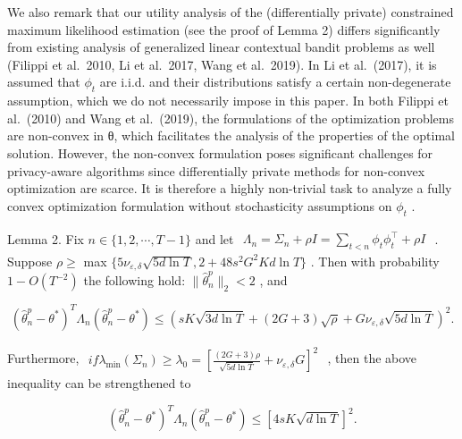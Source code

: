 We also remark that our utility analysis of the (differentially private) constrained maximum likelihood estimation (see the proof of Lemma 2) differs significantly from existing analysis of generalized linear contextual bandit problems as well (Filippi et al.~2010, Li et al.~2017, Wang et al.~2019). In Li et al.~(2017), it is assumed that \(\phi _ { t }\) are i.i.d. and their distributions satisfy a certain non-degenerate assumption, which we do not necessarily impose in this paper. In both Filippi et al.~(2010) and Wang et al.~(2019), the formulations of the optimization problems are non-convex in θ, which facilitates the analysis of the properties of the optimal solution. However, the non-convex formulation poses significant challenges for privacy-aware algorithms since differentially private methods for non-convex optimization are scarce. It is therefore a highly non-trivial task to analyze a fully convex optimization formulation without stochasticity assumptions on \(\phi _ { t }\) .

Lemma 2. Fix \(n \in \{ 1 , 2 , \cdots , T - 1 \}\) and let \(\begin{array} { r } { \Lambda _ { n } = \Sigma _ { n } + \rho I = \sum _ { t < n } \phi _ { t } \phi _ { t } ^ { \top } + \rho I } \end{array}\) . Suppose \(\rho \geq\) max \(\{ 5 \nu _ { \varepsilon , \delta } \sqrt { 5 d \ln T } , 2 + 4 8 s ^ { 2 } G ^ { 2 } K d \ln T \}\) . Then with probability \(1 - O ( T ^ { - 2 } )\) the following hold: \(\| \widehat { \theta } _ { n } ^ { p } \| _ { 2 } < 2\) , and

\[
(\widehat {\theta} _ {n} ^ {p} - \theta^ {*}) ^ {T} \Lambda_ {n} (\widehat {\theta} _ {n} ^ {p} - \theta^ {*}) \leq \left(s K \sqrt {3 d \ln T} + (2 G + 3) \sqrt {\rho} + G \nu_ {\varepsilon , \delta} \sqrt {5 d \ln T}\right) ^ {2}. \tag {4}
\]

Furthermore, \(\begin{array} { r } { i f \lambda _ { \operatorname* { m i n } } ( \Sigma _ { n } ) \geq \lambda _ { 0 } = [ \frac { ( 2 G + 3 ) \rho } { \sqrt { 5 d \ln T } } + \nu _ { \varepsilon , \delta } G ] ^ { 2 } } \end{array}\) , then the above inequality can be strengthened to

\[
(\widehat {\theta} _ {n} ^ {p} - \theta^ {*}) ^ {T} \Lambda_ {n} (\widehat {\theta} _ {n} ^ {p} - \theta^ {*}) \leq [ 4 s K \sqrt {d \ln T} ] ^ {2}. \tag {5}
\]

